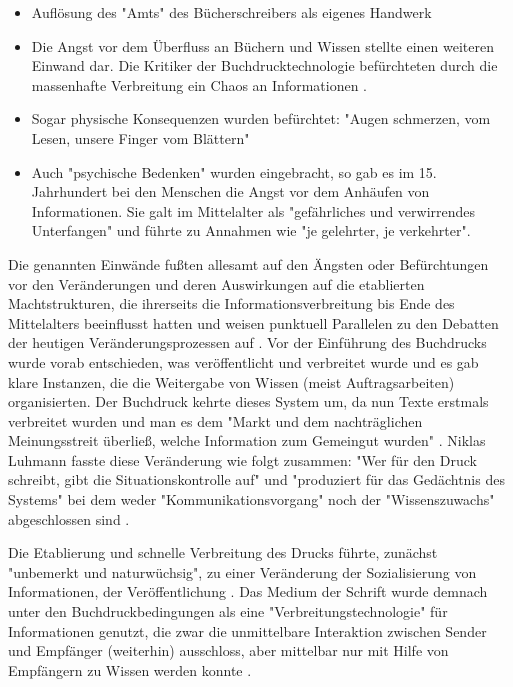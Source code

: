\begin{itemize}
\item Auflösung des "Amts" des Bücherschreibers als eigenes Handwerk
\item Die Angst vor dem Überfluss an Büchern und Wissen stellte einen weiteren Einwand dar. Die Kritiker der Buchdrucktechnologie befürchteten  durch die massenhafte Verbreitung ein Chaos an Informationen \cite{giesecke_1991_buchdruck}.
\item Sogar physische Konsequenzen wurden befürchtet: "Augen schmerzen, vom Lesen, unsere Finger vom Blättern" \cite{giesecke_1991_buchdruck}
\item Auch "psychische Bedenken" wurden eingebracht, so gab es im 15. Jahrhundert bei den Menschen die Angst vor dem Anhäufen von Informationen. Sie galt im Mittelalter als "gefährliches und verwirrendes Unterfangen" und führte zu Annahmen wie "je gelehrter, je verkehrter". \cite{giesecke_1991_buchdruck}
\end{itemize}

Die genannten Einwände fußten allesamt auf den Ängsten oder Befürchtungen vor den Veränderungen und deren Auswirkungen auf die etablierten Machtstrukturen, die ihrerseits die Informationsverbreitung bis Ende des Mittelalters beeinflusst hatten und weisen punktuell Parallelen zu den Debatten der heutigen Veränderungsprozessen auf \cite{hagner_2015_sache_buches}. Vor der Einführung des Buchdrucks wurde vorab entschieden, was veröffentlicht und verbreitet wurde und es gab klare Instanzen, die die Weitergabe von Wissen (meist Auftragsarbeiten) organisierten. Der Buchdruck kehrte dieses System um, da nun Texte erstmals verbreitet wurden und man es dem "Markt und dem nachträglichen Meinungsstreit überließ, welche Information zum Gemeingut wurden" \cite{giesecke_1991_buchdruck}. Niklas Luhmann fasste diese Veränderung wie folgt zusammen: "Wer für den Druck schreibt, gibt die Situationskontrolle auf" und "produziert für das Gedächtnis des Systems" bei dem weder "Kommunikationsvorgang" noch der "Wissenszuwachs" abgeschlossen sind \cite{Luhmann1998}.

Die Etablierung und schnelle Verbreitung \cite{stober_2014_pressegeschichte} des Drucks führte, zunächst "unbemerkt und naturwüchsig", zu einer Veränderung der Sozialisierung von Informationen, der Veröffentlichung \cite{giesecke_1991_buchdruck}. Das Medium der Schrift wurde demnach unter den Buchdruckbedingungen als eine "Verbreitungstechnologie" für Informationen genutzt, die zwar die unmittelbare Interaktion zwischen Sender und Empfänger (weiterhin) ausschloss, aber mittelbar nur mit Hilfe von Empfängern zu Wissen werden konnte \cite{Luhmann1998}.

